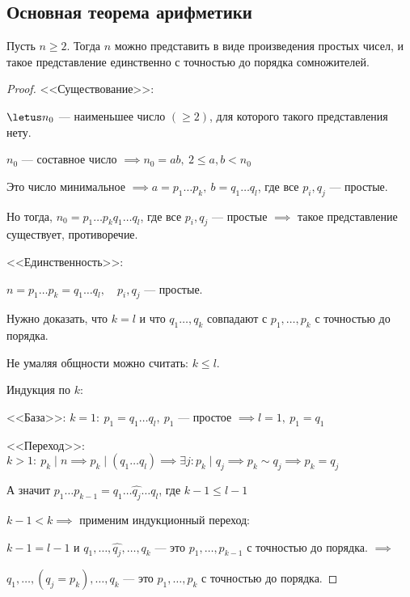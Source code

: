 \subsection{Основная теорема арифметики}

\begin{theorem}
    Пусть $n \geq 2$. Тогда $n$ можно представить в виде произведения простых чисел, и такое представление единственно с точностью до порядка сомножителей.    
\end{theorem}

\begin{proof}
    
    <<Существование>>:
    
    $\letus n_0$ --- наименьшее число $(\geq 2)$, для которого такого представления нету.
    
    $n_0$ --- составное число $\implies n_0 = ab,~ 2 \leq a, b < n_0$
    
    Это число минимальное $\implies a = p_1 \ldots p_k,~b = q_1 \ldots q_l$, где все $p_i, q_j$ --- простые.
    
    Но тогда, $ n_0 = p_1 \ldots p_k q_1 \ldots q_l$, где все $p_i, q_j$ --- простые $\implies$ такое представление существует, противоречие.
    
    <<Единственность>>:
    
    $n = p_1 \ldots p_k = q_1 \ldots q_l,\quad p_i, q_j$ --- простые.
    
    Нужно доказать, что $k = l$ и что $q_1 \ldots, q_k$ совпадают с $p_1, \ldots, p_k$ с точностью до порядка.
    
    Не умаляя общности можно считать: $k \leq l$. 
    
    Индукция по $k$:
    
    <<База>>: $k = 1:\ p_1 = q_1 \ldots q_l,~p_1$ --- простое $\implies l = 1,~ p_1 = q_1$
    
    <<Переход>>: $k > 1:\ p_k \mid n \implies p_k \mid (q_1 \ldots q_l) \implies \exists j : p_k \mid q_j \implies p_k \sim q_j \implies p_k = q_j$
    
    А значит $p_1 \ldots p_{k-1} = q_1 \ldots \hat{q_j} \ldots q_l$, где $k-1 \leq l-1$
    
    $k-1 < k \implies$ применим индукционный переход:
    
    $k-1 = l-1$ и $q_1, \ldots, \hat{q_j}, \ldots, q_k$ --- это $p_1, \ldots, p_{k-1}$ с точностью до порядка. $\implies$
    
    $q_1, \ldots, (q_j = p_k), \ldots, q_k$ --- это $p_1, \ldots, p_k$ с точностью до порядка.
\end{proof}

